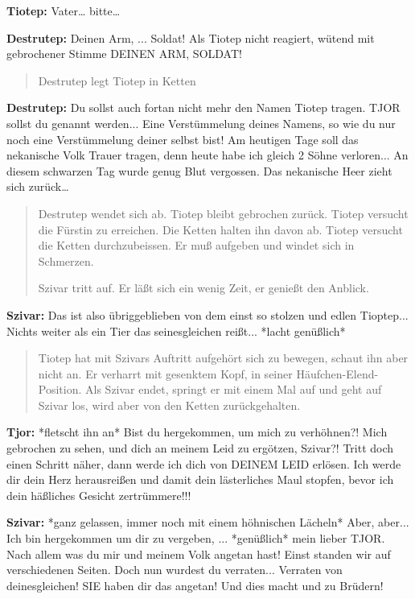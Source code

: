 \documentclass[a5paper,6pt]{book}
\begin{document}
\textbf{Tiotep:} Vater… bitte…

\textbf{Destrutep:} Deinen Arm, ... Soldat! Als Tiotep nicht reagiert, wütend mit gebrochener Stimme
DEINEN ARM, SOLDAT!

\begin{quote}
Destrutep legt Tiotep in Ketten                                                      
 \end{quote} 


\textbf{Destrutep:} Du sollst auch fortan nicht mehr den Namen Tiotep tragen. TJOR sollst du
genannt werden... Eine Verstümmelung deines Namens, so wie du nur noch eine
Verstümmelung deiner selbst bist!
Am heutigen Tage soll das nekanische Volk Trauer tragen, denn heute habe ich
gleich 2 Söhne verloren...
An diesem schwarzen Tag wurde genug Blut vergossen. Das nekanische Heer
zieht sich zurück…

\begin{quote}
Destrutep wendet sich ab. Tiotep bleibt gebrochen zurück. Tiotep versucht die Fürstin zu
erreichen. Die Ketten halten ihn davon ab. Tiotep versucht die Ketten durchzubeissen. Er muß
aufgeben und windet sich in Schmerzen.

Szivar tritt auf. Er läßt sich ein wenig Zeit, er genießt den Anblick.                                                    
 \end{quote} 


\textbf{Szivar:} Das ist also übriggeblieben von dem einst so stolzen und edlen Tioptep... Nichts
weiter als ein Tier das seinesgleichen reißt... *lacht genüßlich*

\begin{quote}
Tiotep hat mit Szivars Auftritt aufgehört sich zu bewegen, schaut ihn aber nicht an. Er
verharrt mit gesenktem Kopf, in seiner Häufchen-Elend-Position. Als Szivar endet, springt er
mit einem Mal auf und geht auf Szivar los, wird aber von den Ketten zurückgehalten.                                                 
 \end{quote} 

\textbf{Tjor:} *fletscht ihn an* Bist du hergekommen, um mich zu verhöhnen?! Mich gebrochen zu
sehen, und dich an meinem Leid zu ergötzen, Szivar?! Tritt doch einen Schritt näher,
dann werde ich dich von DEINEM LEID erlösen. Ich werde dir dein Herz
herausreißen und damit dein lästerliches Maul stopfen, bevor ich dein häßliches
Gesicht zertrümmere!!!

\textbf{Szivar:} *ganz gelassen, immer noch mit einem höhnischen Lächeln* Aber, aber... Ich bin
hergekommen um dir zu vergeben, ... *genüßlich* mein lieber TJOR. Nach allem
was du mir und meinem Volk angetan hast! Einst standen wir auf verschiedenen
Seiten. Doch nun wurdest du verraten... Verraten von deinesgleichen! SIE haben dir
das angetan! Und dies macht und zu Brüdern!
\end{document}
